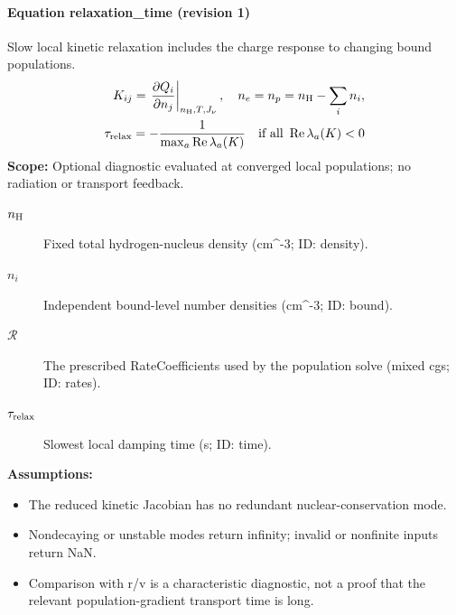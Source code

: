 \paragraph{Equation relaxation\_time (revision 1)}
Slow local kinetic relaxation includes the charge response to changing bound populations.
\begin{equation}
\begin{aligned}
K_{ij}=\left.\frac{\partial Q_i}{\partial n_j}\right|_{n_{\rm H},T,J_\nu},\quad n_e=n_p=n_{\rm H}-\sum_i n_i,\\\tau_{\rm relax}=-\frac{1}{\max_a\operatorname{Re}\lambda_a(K)}\quad\text{if all }\operatorname{Re}\lambda_a(K)<0
\end{aligned}
\label{eq:escape.hydrogen_5f_nlte:relaxation_5f_time:1}
\end{equation}
\noindent\textbf{Scope:} Optional diagnostic evaluated at converged local populations; no radiation or transport feedback.

\begin{description}
\item[$n_{\rm H}$] Fixed total hydrogen-nucleus density (cm\textasciicircum{}-3; ID: density).
\item[$n_i$] Independent bound-level number densities (cm\textasciicircum{}-3; ID: bound).
\item[$\mathcal R$] The prescribed RateCoefficients used by the population solve (mixed cgs; ID: rates).
\item[$\tau_{\rm relax}$] Slowest local damping time (s; ID: time).
\end{description}

\noindent\textbf{Assumptions:}
\begin{itemize}
\item The reduced kinetic Jacobian has no redundant nuclear-conservation mode.
\item Nondecaying or unstable modes return infinity; invalid or nonfinite inputs return NaN.
\item Comparison with r/v is a characteristic diagnostic, not a proof that the relevant population-gradient transport time is long.
\end{itemize}
